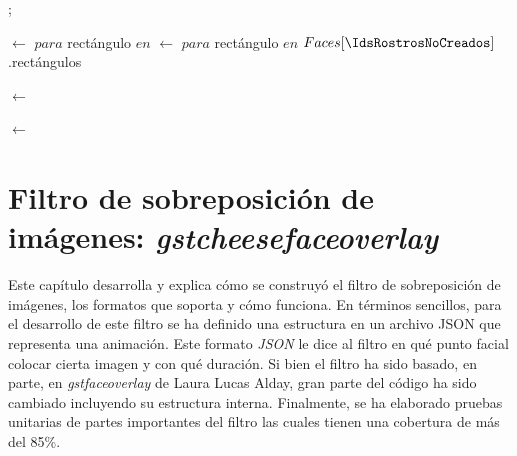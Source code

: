 \documentclass[a4paper,openright,12pt]{report}
\begin{document}
\begin{algorithm}[H]
{     {
      ;
    }

     {
      \centroidesRostrosDetectados$\leftarrow$
          \lbrack{} $para$ rectángulo $en$ \detsRz\rbrack
      \centroidesRostrosNoCreados$\leftarrow$
          \lbrack{} $para$ rectángulo $en$ $Faces[\IdsRostrosNoCreados]$.rectángulos\rbrack

      \MatrizDeCostos$\leftarrow$
          \inicializarMatrizDeCostos{\centroidesRostrosDetectados, \centroidesRostrosNoCreados}

      \asignaciones$\leftarrow$\metodoHungaro{\MatrizDeCostos}

    }
  }




\end{algorithm}

\chapter{Filtro de sobreposición de imágenes: \textit{gstcheesefaceoverlay}}
Este capítulo desarrolla y explica cómo se construyó el filtro de sobreposición
de imágenes, los formatos que soporta y cómo funciona. En términos
sencillos, para el desarrollo de este filtro se ha definido una estructura en
un archivo JSON que representa una animación. Este formato \textit{JSON} le dice
al filtro en qué punto facial colocar cierta imagen y con qué duración. Si bien
el filtro ha sido basado, en parte, en \textit{gstfaceoverlay} de
Laura Lucas Alday, gran parte del código ha sido cambiado incluyendo su
estructura interna. Finalmente, se ha elaborado pruebas unitarias de partes
importantes del filtro las cuales tienen una cobertura de más del 85\%.\\
\end{document}
